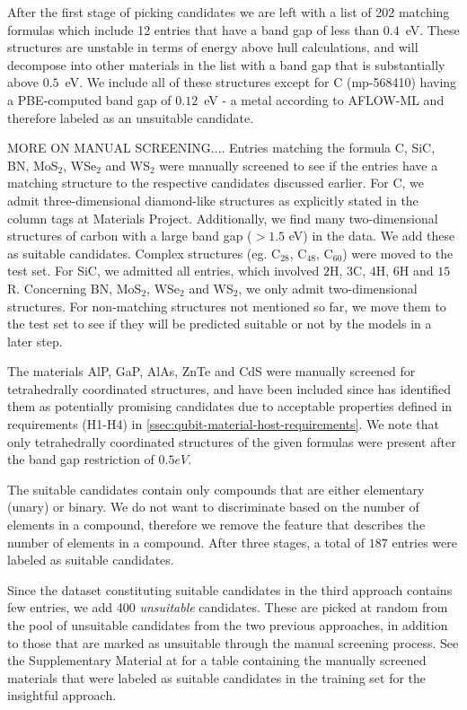 \documentclass[superscriptaddress,unsortedaddress,
 amsmath,amssymb,
 aps,
]{revtex4-2}
\begin{document}
After the first stage of picking candidates we are left with a list of 202 matching formulas which include 12 entries that have a band gap of less than $0.4$~eV. These structures are unstable in terms of energy above hull calculations, and will decompose into other materials in the list with a band gap that is substantially above $0.5$~eV. We include all of these structures except for C (mp-568410) having a PBE-computed band gap of $0.12$~eV - a metal according to AFLOW-ML and therefore labeled as an unsuitable candidate. 
 
MORE ON MANUAL SCREENING....
Entries matching the formula C, SiC, BN, MoS$_2$, WSe$_2$ and WS$_2$ were manually screened to see if the entries have a matching structure to the respective candidates discussed earlier. %
For C, we admit three-dimensional diamond-like structures as explicitly stated in the column tags at Materials Project. Additionally, we find many two-dimensional structures of carbon with a large band gap ($>1.5$ eV) in the data. We add these as suitable candidates. Complex structures (eg. C$_{28}$, C$_{48}$, C$_{60}$) were moved to the test set. For SiC, we admitted all entries, which involved $2$H, $3$C, $4$H, $6$H and $15$R. Concerning BN, MoS$_2$, WSe$_2$ and  WS$_2$, we only admit two-dimensional structures. For non-matching structures not mentioned so far, we move them to the test set to see if they will be predicted suitable or not by the models in a later step.

The materials AlP, GaP, AlAs, ZnTe and CdS were manually screened for tetrahedrally coordinated structures, and have been included since \citeauthor{Weber2010} \cite{Weber2010} has identified them as potentially promising candidates due to acceptable properties defined in requirements (H1-H4) in \autoref{ssec:qubit-material-host-requirements}. We note that only tetrahedrally coordinated structures of the given formulas were present after the band gap restriction of $0.5eV$.

The suitable candidates contain only compounds that are either elementary (unary) or binary. We do not want to discriminate based on the number of elements in a compound, therefore we remove the feature that describes the number of elements in a compound. After three stages, a total of $187$ entries were labeled as suitable candidates.

Since the dataset constituting suitable candidates in the third approach contains few entries, we add 400 \emph{unsuitable}
candidates. These are picked at random from the pool of unsuitable candidates 
from the two previous approaches, in addition to those that are marked as unsuitable through
the manual screening process. 
See the Supplementary Material at \cite{supplementary} for a table containing the manually screened materials that were labeled as suitable candidates in the training set for the insightful approach. 
\end{document}
